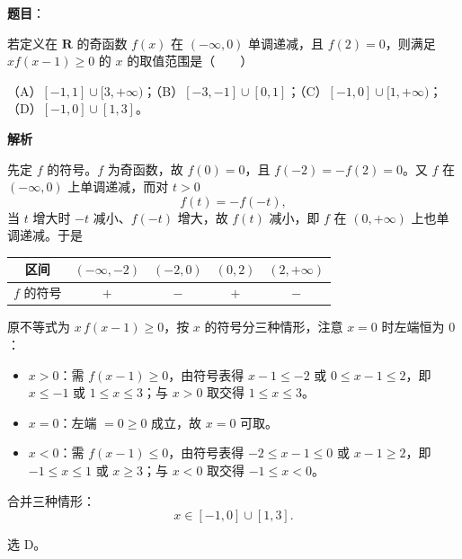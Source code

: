 \begin{answer}

\textbf{题目}：

若定义在 $\mathbf R$ 的奇函数 $f(x)$ 在 $(-\infty,0)$ 单调递减，且 $f(2)=0$，则满足 $xf(x-1)\geqslant0$ 的 $x$ 的取值范围是\mbox{（　　）}

（A）$[-1,1]\cup[3,+\infty)$；（B）$[-3,-1]\cup[0,1]$；（C）$[-1,0]\cup[1,+\infty)$；（D）$[-1,0]\cup[1,3]$。

\textbf{解析}

先定 $f$ 的符号。$f$ 为奇函数，故 $f(0)=0$，且 $f(-2)=-f(2)=0$。又 $f$ 在 $(-\infty,0)$ 上单调递减，而对 $t>0$
\nopagebreak[4]
\[f(t)=-f(-t),\]
当 $t$ 增大时 $-t$ 减小、$f(-t)$ 增大，故 $f(t)$ 减小，即 $f$ 在 $(0,+\infty)$ 上也单调递减。于是

\begin{center}
\begin{tabular}{ccccc}
\toprule
区间 & $(-\infty,-2)$ & $(-2,0)$ & $(0,2)$ & $(2,+\infty)$ \\
\midrule
$f$ 的符号 & $+$ & $-$ & $+$ & $-$ \\
\bottomrule
\end{tabular}
\end{center}

原不等式为 $x\,f(x-1)\geqslant0$，按 $x$ 的符号分三种情形，注意 $x=0$ 时左端恒为 $0$：

\begin{itemize}
\item \textbf{$x>0$}：需 $f(x-1)\geqslant0$，由符号表得 $x-1\leqslant-2$ 或 $0\leqslant x-1\leqslant2$，即 $x\leqslant-1$ 或 $1\leqslant x\leqslant3$；与 $x>0$ 取交得 $1\leqslant x\leqslant3$。
\item \textbf{$x=0$}：左端 $=0\geqslant0$ 成立，故 $x=0$ 可取。
\item \textbf{$x<0$}：需 $f(x-1)\leqslant0$，由符号表得 $-2\leqslant x-1\leqslant0$ 或 $x-1\geqslant2$，即 $-1\leqslant x\leqslant1$ 或 $x\geqslant3$；与 $x<0$ 取交得 $-1\leqslant x<0$。
\end{itemize}

合并三种情形：
\nopagebreak[4]
\[x\in[-1,0]\cup[1,3].\]

选 D。


\end{answer}
